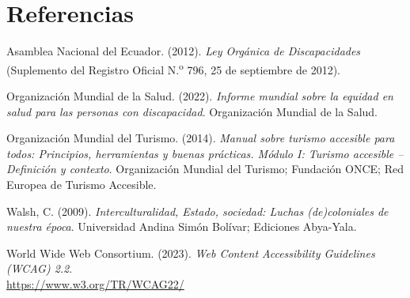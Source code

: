 \documentclass[12pt,letterpaper]{article}
\begin{document}
\newpage

\section{Referencias}

\begingroup
\setlength{\parindent}{0pt}
\setlength{\parskip}{6pt}

Asamblea Nacional del Ecuador. (2012). \textit{Ley Orgánica de Discapacidades} (Suplemento del Registro Oficial N.\textsuperscript{o} 796, 25 de septiembre de 2012).

Organización Mundial de la Salud. (2022). \textit{Informe mundial sobre la equidad en salud para las personas con discapacidad}. Organización Mundial de la Salud.

Organización Mundial del Turismo. (2014). \textit{Manual sobre turismo accesible para todos: Principios, herramientas y buenas prácticas. Módulo I: Turismo accesible -- Definición y contexto}. Organización Mundial del Turismo; Fundación ONCE; Red Europea de Turismo Accesible.

Walsh, C. (2009). \textit{Interculturalidad, Estado, sociedad: Luchas (de)coloniales de nuestra época}. Universidad Andina Simón Bolívar; Ediciones Abya-Yala.

World Wide Web Consortium. (2023). \textit{Web Content Accessibility Guidelines (WCAG) 2.2}. \\ \url{https://www.w3.org/TR/WCAG22/}

\endgroup
\end{document}
